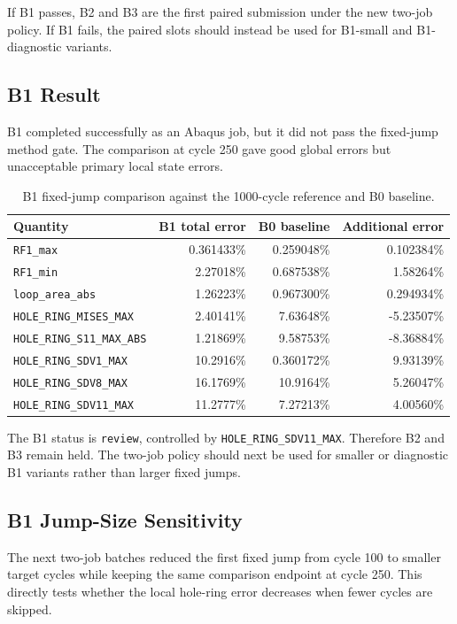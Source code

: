 \documentclass[11pt,a4paper]{article}
\newcommand{\code}[1]{\texttt{#1}}
\begin{document}
If B1 passes, B2 and B3 are the first paired submission under the new two-job policy. If B1 fails, the paired slots should instead be used for B1-small and B1-diagnostic variants.

\subsection{B1 Result}

B1 completed successfully as an Abaqus job, but it did not pass the fixed-jump method gate. The comparison at cycle 250 gave good global errors but unacceptable primary local state errors.

\begin{table}[H]
\centering
\caption{B1 fixed-jump comparison against the 1000-cycle reference and B0 baseline.}
\begin{tabular}{lrrr}
\toprule
Quantity & B1 total error & B0 baseline & Additional error \\
\midrule
\code{RF1\_max} & 0.361433\% & 0.259048\% & 0.102384\% \\
\code{RF1\_min} & 2.27018\% & 0.687538\% & 1.58264\% \\
\code{loop\_area\_abs} & 1.26223\% & 0.967300\% & 0.294934\% \\
\code{HOLE\_RING\_MISES\_MAX} & 2.40141\% & 7.63648\% & -5.23507\% \\
\code{HOLE\_RING\_S11\_MAX\_ABS} & 1.21869\% & 9.58753\% & -8.36884\% \\
\code{HOLE\_RING\_SDV1\_MAX} & 10.2916\% & 0.360172\% & 9.93139\% \\
\code{HOLE\_RING\_SDV8\_MAX} & 16.1769\% & 10.9164\% & 5.26047\% \\
\code{HOLE\_RING\_SDV11\_MAX} & 11.2777\% & 7.27213\% & 4.00560\% \\
\bottomrule
\end{tabular}
\end{table}

The B1 status is \code{review}, controlled by \code{HOLE\_RING\_SDV11\_MAX}. Therefore B2 and B3 remain held. The two-job policy should next be used for smaller or diagnostic B1 variants rather than larger fixed jumps.

\subsection{B1 Jump-Size Sensitivity}

The next two-job batches reduced the first fixed jump from cycle 100 to smaller target cycles while keeping the same comparison endpoint at cycle 250. This directly tests whether the local hole-ring error decreases when fewer cycles are skipped.
\end{document}
